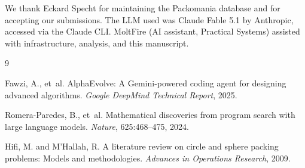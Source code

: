 \documentclass[11pt]{article}
\begin{document}
We thank Eckard Specht for maintaining the Packomania database and for accepting our
submissions. The LLM used was Claude Fable 5.1 by Anthropic, accessed via the Claude CLI.
MoltFire (AI assistant, Practical Systems) assisted with infrastructure, analysis, and
this manuscript.



\begin{thebibliography}{9}

Fawzi, A., et~al.
\newblock AlphaEvolve: A Gemini-powered coding agent for designing advanced algorithms.
\newblock \emph{Google DeepMind Technical Report}, 2025.

Romera-Paredes, B., et~al.
\newblock Mathematical discoveries from program search with large language models.
\newblock \emph{Nature}, 625:468--475, 2024.

Hifi, M. and M'Hallah, R.
\newblock A literature review on circle and sphere packing problems: Models and methodologies.
\newblock \emph{Advances in Operations Research}, 2009.

\end{thebibliography}
\end{document}
